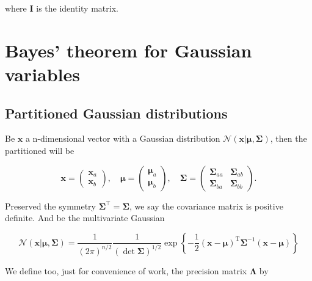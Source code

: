 \begin{appendices}
where $\mathbf{I}$ is the identity matrix.

\vspace{4em}

  \section{Bayes' theorem for Gaussian variables\cite{schon_lindsten}}
  \label{subsec:app-par-gau}

  \subsection{Partitioned Gaussian distributions}
  Be $\mathbf{x}$ a n-dimensional vector with a Gaussian distribution $\mathcal{N}\left( \mathbf{x} | \boldsymbol{\mu}, \boldsymbol{\Sigma} \right)$, then the partitioned will be
  
  \begin{equation}
    \mathbf{x}=
    \begin{pmatrix}
    \mathbf{x}_a \\  
    \mathbf{x}_b 
    \end{pmatrix}
    ,\quad 
    \boldsymbol{\mu}=
    \begin{pmatrix}
      \boldsymbol{\mu}_a \\
      \boldsymbol{\mu}_b
    \end{pmatrix}
    ,\quad 
    \boldsymbol{\Sigma}=
    \begin{pmatrix}
      \boldsymbol{\Sigma}_{aa} & \boldsymbol{\Sigma}_{ab}  \\
      \boldsymbol{\Sigma}_{ba} & \boldsymbol{\Sigma}_{bb}
    \end{pmatrix}
    .
  \end{equation}

  Preserved the symmetry $\boldsymbol{\Sigma}^\top = \boldsymbol{\Sigma}$, we say the covariance matrix is positive definite. And be the multivariate Gaussian

  \begin{equation}
    \label{eq:app-par-gau-multivariate-gaussian}
    \mathcal{N}(\mathbf{x} | \boldsymbol{\mu}, \mathbf{\Sigma})=\frac{1}{(2 \pi)^{n / 2}} \frac{1}{ \left( \det \mathbf{\Sigma} \right) ^{1 / 2}} \exp \left\{-\frac{1}{2}(\mathbf{x}-\boldsymbol{\mu})^{\mathrm{T}} \boldsymbol{\Sigma}^{-1}(\mathbf{x}-\boldsymbol{\mu})\right\}
  \end{equation}

  We define too, just for convenience of work, the precision matrix $\boldsymbol{\Lambda}$ by


\end{appendices}
